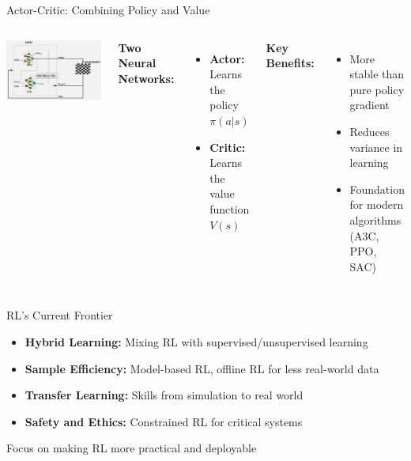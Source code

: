 \documentclass[aspectratio=169]{beamer}
\begin{document}
\begin{frame}{Actor-Critic: Combining Policy and Value}
  \begin{columns}
    \begin{center}
      \includegraphics[width=\textwidth]{images/actorcritic.png}
    \end{center}
    
    \textbf{Two Neural Networks:}
    \begin{itemize}
      \item \textbf{Actor:} Learns the policy $\pi(a|s)$
      \item \textbf{Critic:} Learns the value function $V(s)$
    \end{itemize}
    
    \vspace{0.5cm}
    \textbf{Key Benefits:}
    \begin{itemize}
      \item More stable than pure policy gradient
      \item Reduces variance in learning
      \item Foundation for modern algorithms (A3C, PPO, SAC)
    \end{itemize}
  \end{columns}
\end{frame}

\begin{frame}{RL's Current Frontier}
  \begin{itemize}
    \item \textbf{Hybrid Learning:} Mixing RL with
      supervised/unsupervised learning
    \item \textbf{Sample Efficiency:} Model-based RL, offline RL for
      less real-world data
    \item \textbf{Transfer Learning:} Skills from simulation to real world
    \item \textbf{Safety and Ethics:} Constrained RL for critical systems
  \end{itemize}

  \vspace{0.5cm}
  \centering
  Focus on making RL more practical and deployable
\end{frame}
\end{document}

